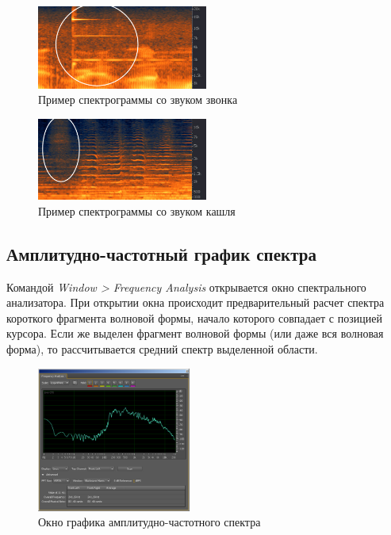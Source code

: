 \documentclass[oneside, final, 14pt]{extreport}
\begin{document}
\begin{figure}[h!]
\centering
\includegraphics[width=0.5\textwidth]{pic-ringing-01}
\caption{Пример спектрограммы со звуком звонка}
\label{pic-ringing-01}
\end{figure}

\begin{figure}[h!]
\centering
\includegraphics[width=0.5\textwidth]{pic-cough-01}
\caption{Пример спектрограммы со звуком кашля}
\label{pic-cough-01}
\end{figure}

\subsection{Амплитудно-частотный график спектра}
Командой \textit{Window > Frequency Analysis} открывается окно спектрального анализатора. При открытии окна происходит предварительный расчет спектра короткого фрагмента волновой формы, начало которого совпадает с позицией курсора. Если же выделен фрагмент волновой формы (или даже вся волновая форма), то рассчитывается средний спектр выделенной области.

\begin{figure}[h!]
\centering
\includegraphics[width=0.45\textwidth]{pic-specter-01}
\caption{Окно графика амплитудно-частотного спектра}
\label{pic-specter-01}
\end{figure}
\end{document}
